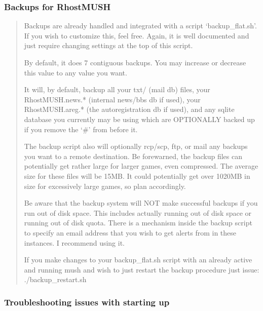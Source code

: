 \documentclass[letterpaper,10pt,english]{sphinxmanual}
\begin{document}
\subsubsection{Backups for RhostMUSH}
\label{\detokenize{installation:backups-for-rhostmush}}\begin{quote}

\sphinxAtStartPar
Backups are already handled and integrated with a script ‘backup\_flat.sh’.
If you wish to customize this, feel free.  Again, it is well documented and
just require changing settings at the top of this script.

\sphinxAtStartPar
By default, it does 7 contiguous backups.  You may increase or decrease
this value to any value you want.

\sphinxAtStartPar
It will, by default, backup all your txt/
(mail db) files, your RhostMUSH.news.* (internal news/bbs db \textendash{} if used),
your RhostMUSH.areg.* (the autoregistration db \textendash{} if used), and any sqlite
database you currently may be using which are OPTIONALLY backed up if you
remove the ‘\#’ from before it.

\sphinxAtStartPar
The backup script also will optionally rcp/scp, ftp, or mail any backups
you want to a remote destination.  Be forewarned, the backup files can
potentially get rather large for larger games, even compressed.  The
average size for these files will be 1\sphinxhyphen{}5MB.  It could potentially get
over 10\sphinxhyphen{}20MB in size for excessively large games, so plan accordingly.

\sphinxAtStartPar
Be aware that the backup system will NOT make successful backups if you
run out of disk space.  This includes actually running out of disk space
or running out of disk quota.  There is a mechanism inside the backup
script to specify an email address that you wish to get alerts from
in these instances.  I recommend using it.

\sphinxAtStartPar
If you make changes to your backup\_flat.sh script with an already
active and running mush and wish to just restart the backup procedure
just issue: ./backup\_restart.sh
\end{quote}


\subsubsection{Troubleshooting issues with starting up}
\label{\detokenize{installation:troubleshooting-issues-with-starting-up}}
\end{document}
